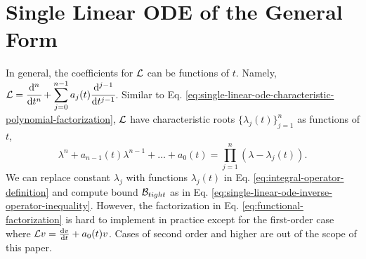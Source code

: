 \section{Single Linear ODE of the General Form}
   In general, the coefficients for $\mathcal{L}$ can be functions of $t$. Namely, $\displaystyle \mathcal{L} = \cfrac{\mathrm{d}^{n} }{\mathrm{d} t^{n}} + \sum_{j=0}^{n-1}a_j(t)\cfrac{\mathrm{d}^{j-1} }{\mathrm{d} t^{j-1}}$.
   Similar to Eq. \eqref{eq:single-linear-ode-characteristic-polynomial-factorization}, $\mathcal{L}$ have characteristic roots $\{\lambda_{j}(t)\}_{j=1}^{n}$ as functions of $t$,
    {
        \begin{equation*} \label{eq:functional-factorization}
            \lambda^n + a_{n-1}(t)\lambda^{n-1} + \dots + a_0(t) = \prod_{j=1}^{n}(\lambda - \lambda_j(t)).
        \end{equation*}
    }
    We can replace constant $\lambda_j$ with functions $\lambda_j(t)$ in Eq. \eqref{eq:integral-operator-definition} and compute bound $\mathcal{B}_{tight}$ as in Eq. \eqref{eq:single-linear-ode-inverse-operator-inequality}.
    However, the factorization in Eq. \eqref{eq:functional-factorization} is hard to implement in practice except for the first-order case  where $\mathcal{L} v = \frac{\mathrm{d}v}{\mathrm{d}t} + a_0(t)v$. 
    Cases of second order and higher are out of the scope of this paper.

